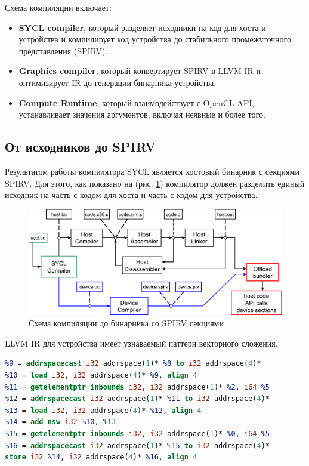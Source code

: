 \documentclass[a4paper,12pt,oneside]{article}
\begin{document}
Схема компиляции включает:

\begin{itemize}
\item \textbf{SYCL compiler}, который разделяет исходники на код для хоста и устройства и компилирует код устройства до стабильного промежуточного представления (SPIRV).
\item \textbf{Graphics compiler}, который конвертирует SPIRV в LLVM IR и оптимизирует IR до генерации бинарника устройства. 
\item \textbf{Compute Runtime}, который взаимодействует с OpenCL API, устанавливает значения аргументов, включая неявные и более того.
\end{itemize}

\subsection{От исходников до SPIRV}\label{subsec:syclcompiler}

Результатом работы компилятора SYCL является хостовый бинарник с секциями SPIRV. Для этого, как показано на (рис. \ref{fig:syclscheme}) компилятор должен разделить единый исходник на часть с кодом для хоста и часть с кодом для устройства.

\begin{figure}
\centering
\includegraphics[width=1.1\textwidth]{pictures/sycl-scheme.pdf}
\caption{Схема компиляции до бинарника со SPIRV секциями}
\label{fig:syclscheme}
\end{figure}

LLVM IR для устройства имеет узнаваемый паттерн векторного сложения.

\begin{lstlisting}[language=llvm,caption={Сложение векторов: device IR после SYCL компилятора},label={lst:syclvaddllvm}]
%8 = getelementptr inbounds i32, i32 addrspace(1)* %1, i64 %5
%9 = addrspacecast i32 addrspace(1)* %8 to i32 addrspace(4)*
%10 = load i32, i32 addrspace(4)* %9, align 4
%11 = getelementptr inbounds i32, i32 addrspace(1)* %2, i64 %5
%12 = addrspacecast i32 addrspace(1)* %11 to i32 addrspace(4)*
%13 = load i32, i32 addrspace(4)* %12, align 4
%14 = add nsw i32 %10, %13
%15 = getelementptr inbounds i32, i32 addrspace(1)* %0, i64 %5
%16 = addrspacecast i32 addrspace(1)* %15 to i32 addrspace(4)*
store i32 %14, i32 addrspace(4)* %16, align 4
\end{lstlisting}
\end{document}
